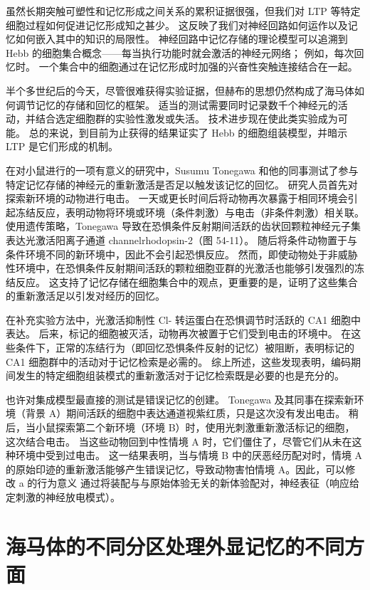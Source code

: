 虽然长期突触可塑性和记忆形成之间关系的累积证据很强，但我们对 LTP 等特定细胞过程如何促进记忆形成知之甚少。 这反映了我们对神经回路如何运作以及记忆如何嵌入其中的知识的局限性。 神经回路中记忆存储的理论模型可以追溯到 Hebb 的细胞集合概念——每当执行功能时就会激活的神经元网络； 例如，每次回忆时。 一个集合中的细胞通过在记忆形成时加强的兴奋性突触连接结合在一起。

半个多世纪后的今天，尽管很难获得实验证据，但赫布的思想仍然构成了海马体如何调节记忆的存储和回忆的框架。 适当的测试需要同时记录数千个神经元的活动，并结合选定细胞群的实验性激发或失活。 技术进步现在使此类实验成为可能。 总的来说，到目前为止获得的结果证实了 Hebb 的细胞组装模型，并暗示 LTP 是它们形成的机制。

在对小鼠进行的一项有意义的研究中，Susumu Tonegawa 和他的同事测试了参与特定记忆存储的神经元的重新激活是否足以触发该记忆的回忆。 研究人员首先对探索新环境的动物进行电击。 一天或更长时间后将动物再次暴露于相同环境会引起冻结反应，表明动物将环境或环境（条件刺激）与电击（非条件刺激）相关联。 使用遗传策略，Tonegawa 导致在恐惧条件反射期间活跃的齿状回颗粒神经元子集表达光激活阳离子通道 channelrhodopsin-2（图 54-11）。 随后将条件动物置于与条件环境不同的新环境中，因此不会引起恐惧反应。 然而，即使动物处于非威胁性环境中，在恐惧条件反射期间活跃的颗粒细胞亚群的光激活也能够引发强烈的冻结反应。 这支持了记忆存储在细胞集合中的观点，更重要的是，证明了这些集合的重新激活足以引发对经历的回忆。

在补充实验方法中，光激活抑制性 Cl- 转运蛋白在恐惧调节时活跃的 CA1 细胞中表达。 后来，标记的细胞被灭活，动物再次被置于它们受到电击的环境中。 在这些条件下，正常的冻结行为（即回忆恐惧条件反射的记忆）被阻断，表明标记的 CA1 细胞群中的活动对于记忆检索是必需的。 综上所述，这些发现表明，编码期间发生的特定细胞组装模式的重新激活对于记忆检索既是必要的也是充分的。

也许对集成模型最直接的测试是错误记忆的创建。 Tonegawa 及其同事在探索新环境（背景 A）期间活跃的细胞中表达通道视紫红质，只是这次没有发出电击。 稍后，当小鼠探索第二个新环境（环境 B）时，使用光刺激重新激活标记的细胞，这次结合电击。 当这些动物回到中性情境 A 时，它们僵住了，尽管它们从未在这种环境中受到过电击。 这一结果表明，当与情境 B 中的厌恶经历配对时，情境 A 的原始印迹的重新激活能够产生错误记忆，导致动物害怕情境 A。因此，可以修改 a 的行为意义 通过将装配与与原始体验无关的新体验配对，神经表征（响应给定刺激的神经放电模式）。

\section{海马体的不同分区处理外显记忆的不同方面}

